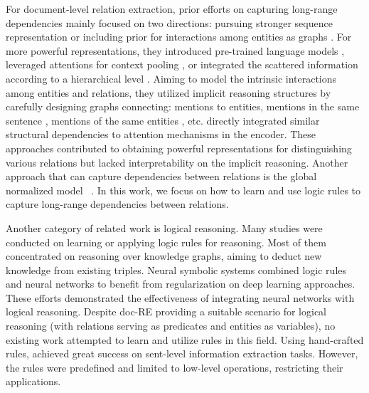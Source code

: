 \documentclass[11pt]{article}
\begin{document}
For document-level relation extraction,
prior efforts on capturing long-range dependencies mainly focused on two directions: pursuing stronger sequence representation \cite{nguyen-verspoor-2018-convolutional, verga-etal-2018-simultaneously, zheng2018effective} or including prior for interactions among entities as graphs \cite{christopoulou-etal-2019-connecting}.
For more powerful representations, they introduced pre-trained language models \cite{wang2019fine, ye-etal-2020-coreferential}, leveraged attentions for context pooling \cite{zhou2021atlop}, or integrated the scattered information according to a hierarchical level \cite{tang12084hin}.
Aiming to model the intrinsic interactions among entities and relations, they utilized implicit reasoning structures by carefully designing graphs connecting: mentions to entities, mentions in the same sentence \cite{christopoulou-etal-2019-connecting,sun2019joint}, mentions of the same entities \cite{wang-etal-2020-global, zeng-etal-2020-double}, etc. \citet{nan-etal-2020-reasoning, xu2021entity} directly integrated similar structural dependencies to attention mechanisms in the encoder.
These approaches contributed to obtaining powerful representations for distinguishing various relations but lacked interpretability on the implicit reasoning.
Another approach that can capture dependencies between relations is the global normalized model ~\cite{andor2016globally,sun2018extracting}.
In this work, we focus on how to learn and use logic rules to capture long-range dependencies between relations.






Another category of related work is logical reasoning.
Many studies were conducted on learning or applying logic rules for reasoning. Most of them \cite{qu2019probabilistic, zhang2020efficient} concentrated on reasoning over knowledge graphs, aiming to deduct new knowledge from existing triples. Neural symbolic systems \cite{hu-etal-2016-harnessing, wang-poon-2018-deep} combined logic rules and neural networks to benefit from regularization on deep learning approaches. These efforts demonstrated the effectiveness of integrating neural networks with logical reasoning. Despite doc-RE providing a suitable scenario for logical reasoning (with relations serving as predicates and entities as variables), no existing work attempted to learn and utilize rules in this field.
Using hand-crafted rules, \citet{wang2020integrating, wu-etal-2020-deep} achieved great success on sent-level information extraction tasks. However, the rules were predefined and limited to low-level operations, restricting their applications. 
\end{document}
